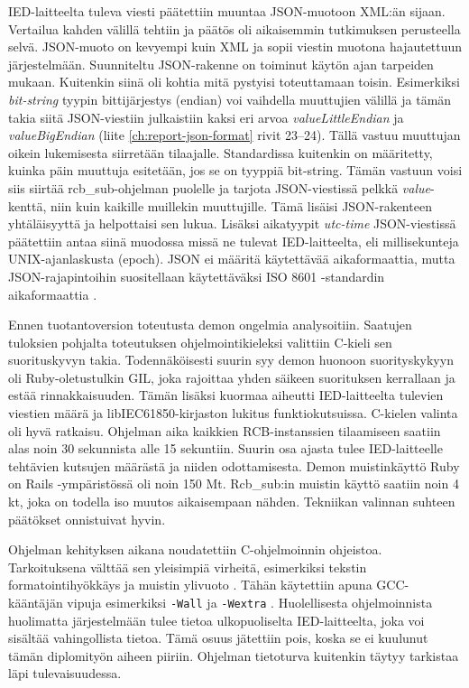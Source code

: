 IED-laitteelta tuleva viesti päätettiin muuntaa JSON-muotoon XML:än sijaan. Vertailua kahden välillä tehtiin ja päätös oli aikaisemmin tutkimuksen perusteella selvä. JSON-muoto on kevyempi kuin XML ja sopii viestin muotona hajautettuun järjestelmään. Suunniteltu JSON-rakenne on toiminut käytön ajan tarpeiden mukaan. Kuitenkin siinä oli kohtia mitä pystyisi toteuttamaan toisin. Esimerkiksi \emph{bit-string} tyypin bittijärjestys (endian) voi vaihdella muuttujien välillä ja tämän takia siitä JSON-viestiin julkaistiin kaksi eri arvoa \emph{valueLittleEndian} ja \emph{valueBigEndian} (liite \ref{ch:report-json-format} rivit 23--24). Tällä vastuu muuttujan oikein lukemisesta siirretään tilaajalle. Standardissa kuitenkin on määritetty, kuinka päin muuttuja esitetään, jos se on tyyppiä bit-string. Tämän vastuun voisi siis siirtää rcb\_sub-ohjelman puolelle ja tarjota JSON-viestissä pelkkä \emph{value}-kenttä, niin kuin kaikille muillekin muuttujille. Tämä lisäisi JSON-rakenteen yhtäläisyyttä ja helpottaisi sen lukua. Lisäksi aikatyypit \emph{utc-time} JSON-viestissä päätettiin antaa siinä muodossa missä ne tulevat IED-laitteelta, eli millisekunteja UNIX-ajanlaskusta (epoch). JSON ei määritä käytettävää aikaformaattia, mutta JSON-rajapintoihin suositellaan käytettäväksi ISO 8601 -standardin aikaformaattia \cite{json-api-specification}.

Ennen tuotantoversion toteutusta demon ongelmia analysoitiin. Saatujen tuloksien pohjalta toteutuksen ohjelmointikieleksi valittiin C-kieli sen suorituskyvyn takia. Todennäköisesti suurin syy demon huonoon suorityskykyyn oli Ruby-oletustulkin GIL, joka rajoittaa yhden säikeen suorituksen kerrallaan ja estää rinnakkaisuuden. Tämän lisäksi kuormaa aiheutti IED-laitteelta tulevien viestien määrä ja libIEC61850-kirjaston lukitus funktiokutsuissa. C-kielen valinta oli hyvä ratkaisu. Ohjelman aika kaikkien RCB-instanssien tilaamiseen saatiin alas noin 30 sekunnista alle 15 sekuntiin. Suurin osa ajasta tulee IED-laitteelle tehtävien kutsujen määrästä ja niiden odottamisesta. Demon muistinkäyttö Ruby on Rails -ympäristössä oli noin 150 Mt. Rcb\_sub:in muistin käyttö saatiin noin 4 kt, joka on todella iso muutos aikaisempaan nähden. Tekniikan valinnan suhteen päätökset onnistuivat hyvin.

Ohjelman kehityksen aikana noudatettiin C-ohjelmoinnin ohjeistoa. Tarkoituksena välttää sen yleisimpiä virheitä, esimerkiksi tekstin formatointihyökkäys \cite{format-string-attack} ja muistin ylivuoto \cite{buffer-overflow-attack}. Tähän käytettiin apuna GCC-kääntäjän vipuja esimerkiksi \texttt{-Wall} ja \texttt{-Wextra} \cite{gcc-manual-warnings}. Huolellisesta ohjelmoinnista huolimatta järjestelmään tulee tietoa ulkopuoliselta IED-laitteelta, joka voi sisältää vahingollista tietoa. Tämä osuus jätettiin pois, koska se ei kuulunut tämän diplomityön aiheen piiriin. Ohjelman tietoturva kuitenkin täytyy tarkistaa läpi tulevaisuudessa.

